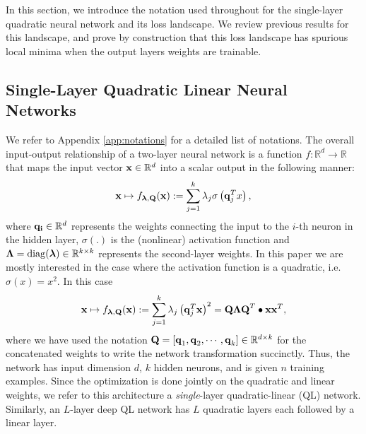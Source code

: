 \documentclass[11pt]{article}
\theoremstyle{plain}
\DeclareMathOperator*{\diag}{diag}
\def\R{\mathbb{R}}
\theoremstyle{plain}
\numberwithin{equation}{section}
\numberwithin{lemma}{section}
\numberwithin{theorem}{section}
\numberwithin{corollary}{section}
\numberwithin{observation}{section}
\numberwithin{definition}{section}
\numberwithin{example}{section}
\begin{document}
In this section, we introduce the notation used throughout for the single-layer quadratic neural network and its loss landscape.  We review previous results for this landscape, and prove by construction that this loss landscape has spurious local minima when the output layers weights are trainable.

\subsection{Single-Layer Quadratic Linear Neural Networks}
We refer to Appendix \ref{app:notations} for a detailed list of notations. The overall input-output relationship of a two-layer neural network is a function $f: \mathbb{R}^d \rightarrow \mathbb{R}$ that maps the input vector $\V{x} \in \mathbb{R}^d$ into a scalar output in the following manner:
\begin{equation}
\V{x} \mapsto f_{\V{\lambda},\Mx{Q}}(\V{x}) := \sum_{j = 1}^k \lambda_j  \sigma \left( \V{q}_j^T {x} \right),
\end{equation}
where $\V{q_i} \in \mathbb{R}^d$ represents the weights connecting the input to the $i$-th neuron in the hidden layer, $\sigma(.)$ is the (nonlinear) activation function and $\Mx{\Lambda} = \diag(\V{\lambda}) \in \R^{k \times k}$ represents the second-layer weights. In this paper we are mostly interested in the case where the activation function is a quadratic, i.e. $\sigma(x) = x^2$. In this case
\begin{equation}
\V{x} \mapsto f_{\V{\lambda},\Mx{Q}}(\V{x}) := \sum_{j = 1}^k \lambda_j  \left( \V{q}_j^T \V{x} \right)^2= \Mx{Q \Lambda Q}^T \bullet \V{xx}^T,
\end{equation}
where we have used the notation $\Mx{Q} = [\V{q}_1,\V{q}_2, \cdots, \V{q}_k] \in \mathbb{R}^{d \times k}$ for the concatenated weights to write the network transformation succinctly.   Thus, the network has input dimension $d$, $k$ hidden neurons, and is given $n$ training examples.  Since the optimization is done jointly on the quadratic and linear weights, we refer to this architecture a \textit{single}-layer quadratic-linear (QL) network. Similarly, an $L$-layer deep QL network has $L$ quadratic layers each followed by a linear layer.
\end{document}
